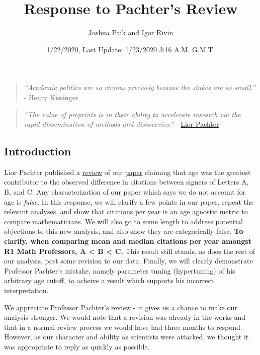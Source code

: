 \documentclass[]{article}
\title{Response to Pachter's Review}
\author{Joshua Paik and Igor Rivin}
\date{1/22/2020, Last Update: 1/23/2020 3:16 A.M. G.M.T.}
\begin{document}
\maketitle

{
\setcounter{tocdepth}{2}
\tableofcontents
}
\begin{quote}
\emph{``Academic politics are so vicious precisely because the stakes
are so small.''} - Henry Kissinger
\end{quote}

\begin{quote}
\emph{``The value of preprints is in their ability to accelerate
research via the rapid dissemination of methods and discoveries.''} -
\href{https://liorpachter.wordpress.com/2019/10/21/zero-data-rna-seq/}{Lior
Pachter}
\end{quote}

\hypertarget{introduction}{%
\subsection{Introduction}\label{introduction}}

Lior Pachter published a
\href{https://liorpachter.wordpress.com/2020/01/17/diversity-matters/}{review}
of our \href{https://arxiv.org/pdf/2001.00670.pdf}{paper} claiming that
age was the greatest contributor to the observed difference in citations
between signers of Letters A, B, and C. Any characterization of our
paper which says we do not account for age is \emph{false}. In this
response, we will clarify a few points in our paper, repeat the relevant
analyses, and show that citations per year is an age agnostic metric to
compare mathematicians. We will also go to some length to address
potential objections to this new analysis, and also show they are
categorically false. \textbf{To clarify, when comparing mean and median
citations per year amongst R1 Math Professors, A \textless{} B
\textless{} C.} This result still stands, as does the rest of our
analysis, post some revision to our data. Finally, we will clearly
demonstrate Professor Pachter's mistake, namely parameter tuning
(hypertuning) of his arbitrary age cutoff, to acheive a result which
supports his incorrect interpretation.

We appreciate Professor Pachter's review - it gives us a chance to make
our analysis stronger. We would note that a revision was already in the
works and that in a normal review process we would have had three months
to respond. However, as our character and ability as scientists were
attacked, we thought it was appropriate to reply as quickly as possible.
\end{document}
